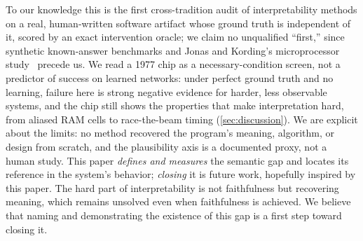 To our knowledge this is the first cross-tradition audit of interpretability methods on a real,
human-written software artifact whose ground truth is independent of it, scored by an exact
intervention oracle; we claim no unqualified ``first,'' since synthetic known-answer benchmarks
and Jonas and Kording's microprocessor study~\cite{jonas2017could} precede us. We read a 1977
chip as a necessary-condition screen, not a predictor of success on learned networks: under
perfect ground truth and no learning, failure here is strong negative evidence for harder, less
observable systems, and the chip still shows the properties that make interpretation hard, from
aliased RAM cells to race-the-beam timing (\Sectionname\ref{sec:discussion}). We are explicit
about the limits: no method recovered the program's meaning, algorithm, or design from scratch,
and the plausibility axis is a documented proxy, not a human study. This paper \emph{defines and
measures} the semantic gap and locates its reference in the system's behavior; \emph{closing} it
is future work, hopefully inspired by this paper. The hard part of interpretability is not
faithfulness but recovering meaning, which remains unsolved even when faithfulness is achieved.
We believe that naming and demonstrating the existence of this gap is a first step toward
closing it.


